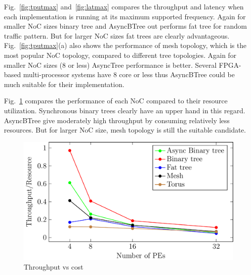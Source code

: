 Fig.~\ref{fig:tputmax} and~\ref{fig:latmax} compares the throughput and latency when each implementation is running at its maximum supported frequency.
Again for smaller NoC sizes binary tree and AsyncBTree out performs fat tree for random traffic pattern.
But for larger NoC sizes fat trees are clearly advantageous.
Fig.~\ref{fig:tputmax}(a) also shows the performance of mesh topology, which is the most popular NoC topology, compared to different tree topologies.
Again for smaller NoC sizes (8 or less) AsyncTree performance is better.
Several FPGA-based multi-processor systems have 8 core or less thus AsyncBTree could be much suitable for their implementation.

Fig.~\ref{fig:tputPerf} compares the performance of each NoC compared to their resource utilization.
Synchronous binary trees clearly have an upper hand in this regard.
AsyncBTree give moderately high throughput by consuming relatively less resources.
But for larger NoC size, mesh topology is still the suitable candidate.


\begin{figure}[t]
\centering
   \includegraphics[width=\columnwidth]{Data/tputVsCost.pdf}
   \caption{Throughput vs cost}
      \label{fig:tputPerf}
\end{figure}
